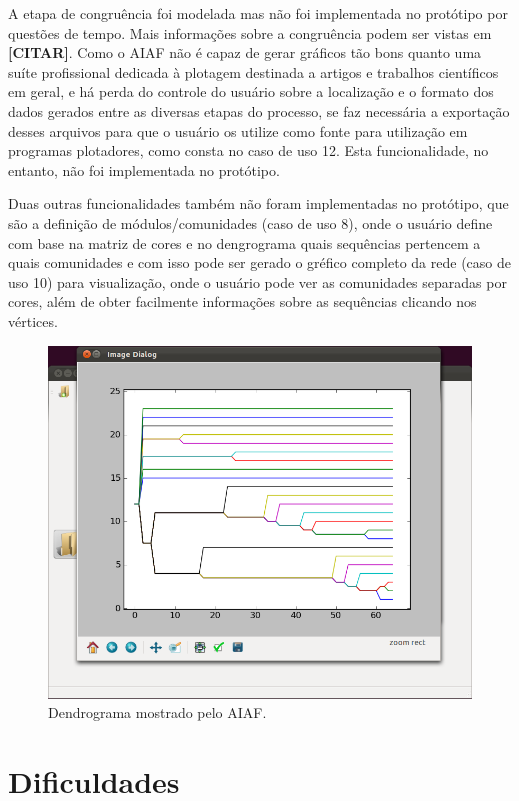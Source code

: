 A etapa de congruência foi modelada mas não foi implementada no protótipo por questões de tempo. Mais informações sobre a congruência podem
ser vistas em \textbf{[CITAR]}. Como o AIAF não é capaz de gerar gráficos tão bons quanto uma suíte profissional dedicada à plotagem destinada a artigos e
trabalhos científicos em geral, e há perda do controle do usuário sobre a localização e o formato dos dados gerados entre as diversas etapas do processo, se
faz necessária a exportação desses arquivos para que o usuário os utilize como fonte para utilização em programas plotadores, como consta no caso de uso
12. Esta funcionalidade, no entanto, não foi implementada no protótipo.

Duas outras funcionalidades também não foram implementadas no protótipo, que são a definição de módulos/comunidades (caso de uso 8), onde o usuário define
com base na matriz de cores e no dengrograma quais sequências pertencem a quais comunidades e com isso pode ser gerado o gréfico completo da rede (caso de
uso 10) para visualização, onde o usuário pode ver as comunidades separadas por cores, além de obter facilmente informações sobre as sequências clicando nos
vértices.

\begin{figure}
\centering
\includegraphics[scale=0.38]{navi-dendrogram}
\caption{Dendrograma mostrado pelo AIAF.}
\label{fig:navi-dendrogram}
\end{figure}

\section{Dificuldades} \label{sec:dificuldades}

